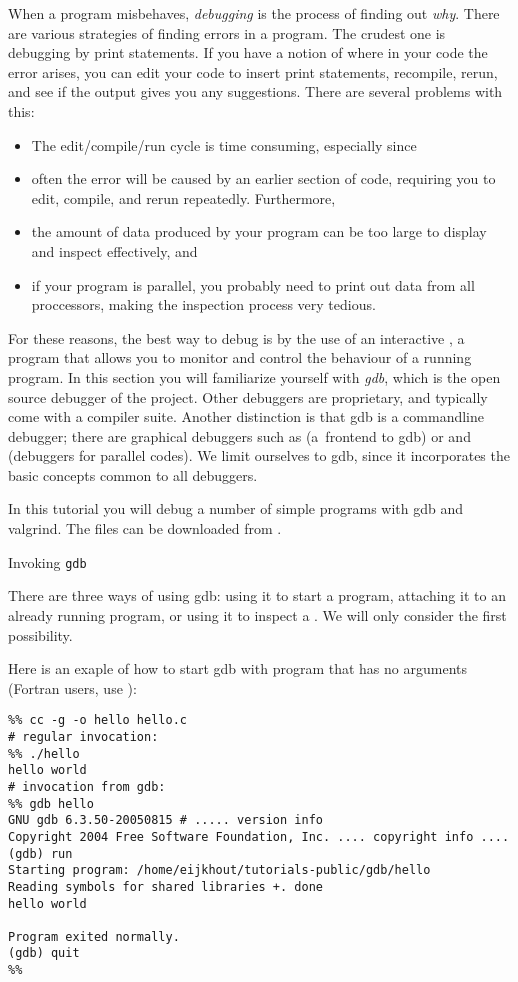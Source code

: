 
When a program misbehaves, \emph{debugging} is the process of finding
out \emph{why}.
There are various strategies of finding errors in a program.
The crudest one is debugging by print statements. If you have a
notion of where in your code the error arises, you can edit your code
to insert print statements, recompile, rerun, and see if the output
gives you any suggestions. There are several problems with this:
\begin{itemize}
\item The edit/compile/run cycle is time consuming, especially since
\item often the error will be caused by an earlier section of code,
  requiring you to edit, compile, and rerun repeatedly. Furthermore,
\item the amount of data produced by your program can be too large to
  display and inspect effectively, and
\item if your program is parallel, you probably need to print out data
  from all proccessors, making the inspection process very tedious.
\end{itemize}


For these reasons, the best way to debug is by the use of an
interactive , a program that allows you to monitor
and control the behaviour of a running program. In this section you
will familiarize yourself with
\emph{gdb}, which is the open source
debugger of the  project. Other debuggers are
proprietary, and typically come with a compiler suite. Another
distinction is that gdb is a commandline debugger; there are
graphical debuggers such as  (a~frontend to gdb) or
 and  (debuggers for parallel
codes). We limit ourselves to gdb, since it incorporates the basic
concepts common to all debuggers.

In this tutorial you will debug a number of simple programs with
gdb and valgrind. The files can be downloaded from
.

 {Invoking {\tt gdb}}

There are three ways of using gdb: using it to start a program,
attaching it to an already running program, or using it to inspect a
. We will only consider the first possibility.

Here is an exaple of how to start gdb with program that has no
arguments (Fortran users, use ):
\begin{verbatim}
%% cc -g -o hello hello.c
# regular invocation:
%% ./hello
hello world
# invocation from gdb:
%% gdb hello
GNU gdb 6.3.50-20050815 # ..... version info
Copyright 2004 Free Software Foundation, Inc. .... copyright info ....
(gdb) run
Starting program: /home/eijkhout/tutorials-public/gdb/hello 
Reading symbols for shared libraries +. done
hello world

Program exited normally.
(gdb) quit
%%
\end{verbatim}

